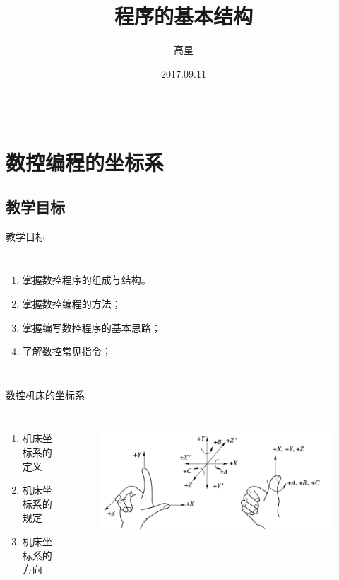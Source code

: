 \documentclass[UTF8,zihao=-4]{ctexbeamer}
\title{程序的基本结构}
\author{高星}
\institute{湖南潇湘技师学院~湖南九嶷职院}
\date{2017.09.11}
\begin{document}
\begin{frame}[plain]
		\maketitle
\end{frame}

\begin{frame}
\begin{columns}
\tableofcontents[hideallsubsections]
\end{columns}
\end{frame}

\section{数控编程的坐标系}
\subsection{教学目标}
\begin{frame}{教学目标}
\begin{columns}
	\begin{enumerate}
	\item 掌握数控程序的组成与结构。
	\item 掌握数控编程的方法；
	\item 掌握编写数控程序的基本思路；
	\item 了解数控常见指令；
\end{enumerate}
\end{columns}
\end{frame}

\begin{frame}{数控机床的坐标系}
	\begin{columns}
		\begin{enumerate}
			\item 机床坐标系的定义
			\item 机床坐标系的规定 
			\item 机床坐标系的方向
		\end{enumerate} 
		\begin{figure}
			\centering
			\includegraphics[width= \linewidth]{image/1-22}
			\label{fig:1-22}
		\end{figure}
	\end{columns}
\end{frame}
\end{document}
